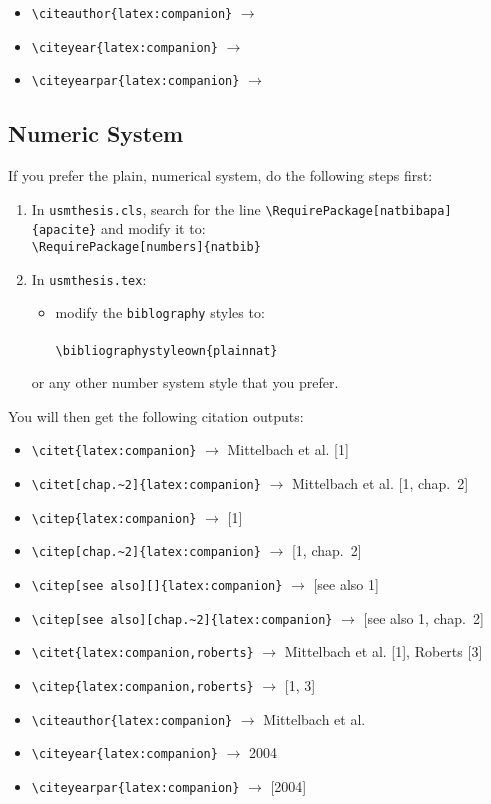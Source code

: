 \begin{itemize}[nosep]
\item \verb|\citeauthor{latex:companion}| $\to$ \citeauthor{latex:companion}
\item \verb|\citeyear{latex:companion}| $\to$ \citeyear{latex:companion}
\item \verb|\citeyearpar{latex:companion}| $\to$ \citeyearpar{latex:companion}
\end{itemize}

\subsection{Numeric System}

If you prefer the plain, numerical system, do the following steps first:
\begin{enumerate}[nosep]
  \item In \texttt{usmthesis.cls}, search for the line \verb|\RequirePackage[natbibapa]{apacite}| and modify it to:\\
  \verb|\RequirePackage[numbers]{natbib}|
  \item In \texttt{usmthesis.tex}:
  \begin{itemize}[nosep]
    \item modify the \verb|biblography| styles to: \\
      \verb|| \\
      \verb|\bibliographystyleown{plainnat}|
    \end{itemize}
    or any other number system style that you prefer.
\end{enumerate}

You will then get the following citation outputs: 


\begin{itemize}[nosep]
\item \verb|\citet{latex:companion}| $\to$ Mittelbach et al. [1]
\item \verb|\citet[chap.~2]{latex:companion}| $\to$ Mittelbach et al. [1, chap.~2]
\item \verb|\citep{latex:companion}| $\to$ [1]
\item \verb|\citep[chap.~2]{latex:companion}| $\to$ [1, chap.~2]
\item \verb|\citep[see also][]{latex:companion}| $\to$ [see also 1]
\item \verb|\citep[see also][chap.~2]{latex:companion}| $\to$ [see also 1, chap.~2]
\item \verb|\citet{latex:companion,roberts}| $\to$ Mittelbach et al. [1], Roberts [3]
\item \verb|\citep{latex:companion,roberts}| $\to$ [1, 3]
\item \verb|\citeauthor{latex:companion}| $\to$ Mittelbach et al.
\item \verb|\citeyear{latex:companion}| $\to$ 2004
\item \verb|\citeyearpar{latex:companion}| $\to$ [2004]
\end{itemize}
